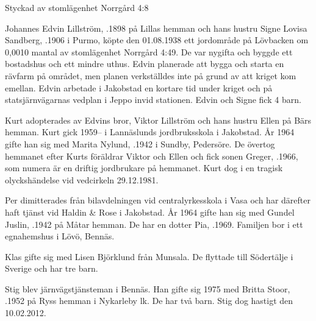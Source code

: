 Styckad av stomlägenhet Norrgård 4:8

\jhvspace{}



Johannes Edvin Lillström, .1898 på Lillas hemman och hans hustru Signe Lovisa Sandberg, .1906 i Purmo, köpte den 01.08.1938 ett jordområde på Lövbacken om 0,0010 mantal av stomlägenhet Norrgård 4:49. De var nygifta och byggde ett bostadshus och ett mindre uthus. Edvin planerade att bygga och starta en rävfarm på området, men planen verkställdes inte på grund av att kriget kom emellan. Edvin arbetade i Jakobstad en kortare tid under kriget och på statsjärnvägarnas vedplan i Jeppo invid stationen. Edvin och Signe fick 4 barn.
\begin{jhchildren}
  \item {}
  \item {}
  \item {}
  \item {}
\end{jhchildren}

Kurt adopterades av Edvins bror, Viktor Lillström och hans hustru Ellen på Bärs hemman. Kurt gick 1959--	i Lannäslunds jordbruksskola i Jakobstad. År 1964 gifte han sig med Marita Nylund, .1942 i Sundby,	Pedersöre. De övertog hemmanet efter Kurts föräldrar Viktor och Ellen och fick sonen Greger, .1966, som numera är en driftig jordbrukare på hemmanet. Kurt dog i en tragisk olyckshändelse vid vedcirkeln 29.12.1981.

Per dimitterades från bilavdelningen vid centralyrkesskola i Vasa och har därefter haft tjänst vid Haldin \& Rose i Jakobstad. År 1964 gifte han sig med Gundel Juslin, .1942 på Måtar hemman. De har en dotter Pia, .1969. Familjen bor i ett egnahemshus i Lövö, Bennäs.

Klas gifte sig med Lisen Björklund från Munsala. De flyttade till Södertälje i Sverige och har tre barn.

Stig blev järnvägstjänsteman i Bennäs. Han gifte sig 1975 med Britta Stoor, .1952 på Ryss hemman i Nykarleby lk. De har två barn. Stig dog hastigt den 10.02.2012.

